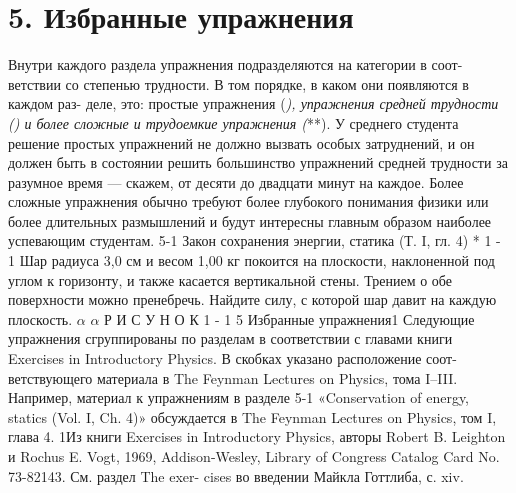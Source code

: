 \documentclass[10pt,oneside]{article}
\begin{document}
\section*{5. Избранные упражнения}
\label{tips-sec-13-5-избранные-упражнения}
Внутри каждого раздела упражнения подразделяются на категории в соот- ветствии со степенью трудности. В том порядке, в каком они появляются в каждом раз- деле, это: простые упражнения (\emph{), упражнения средней трудности (}\emph{) и более сложные и трудоемкие упражнения (}**). У среднего студента решение простых упражнений не должно вызвать особых затруднений, и он должен быть в состоянии решить большинство упражнений средней трудности за разумное время --- скажем, от десяти до двадцати минут на каждое. Более сложные упражнения обычно требуют более глубокого понимания физики или более длительных размышлений и будут интересны главным образом наиболее успевающим студентам. 5-1 Закон сохранения энергии, статика (Т. I, гл. 4) * 1 - 1 Шар радиуса 3,0 см и весом 1,00 кг покоится на плоскости, наклоненной под углом к горизонту, и также касается вертикальной стены. Трением о обе поверхности можно пренебречь. Найдите силу, с которой шар давит на каждую плоскость. \(\alpha\) \(\alpha\) Р И С У Н О К  1 - 1 5 Избранные упражнения1 Следующие упражнения сгруппированы по разделам в соответствии с главами книги Exercises in Introductory Physics. В скобках указано расположение соот- ветствующего материала в The Feynman Lectures on Physics, тома I–III. Например, материал к упражнениям в разделе 5-1 «Conservation of energy, statics (Vol. I, Ch. 4)» обсуждается в The Feynman Lectures on Physics, том I, глава 4. 1Из книги Exercises in Introductory Physics, авторы Robert B. Leighton и Rochus E. Vogt, 1969, Addison-Wesley, Library of Congress Catalog Card No. 73-82143. См. раздел The exer- cises во введении Майкла Готтлиба, с. xiv.\par
\end{document}
